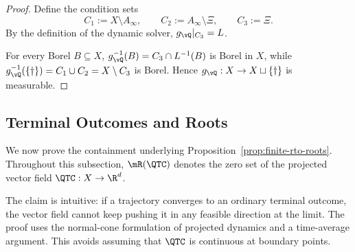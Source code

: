 \begin{proof}
Define the condition sets
\[
C_1:=X\setminus A_\infty,\qquad
C_2:=A_\infty\setminus\Xi,\qquad
C_3:=\Xi.
\]
By the definition of the dynamic solver, $g_{\vQ}|_{C_3}=L$.

For every Borel $B\subseteq X$, $g_{\vQ}^{-1}(B)=C_3\cap L^{-1}(B)$ is Borel
in $X$, while $g_{\vQ}^{-1}(\{\dagger\})=C_1\cup C_2=X\setminus C_3$ is Borel.
Hence
$g_{\vQ}:X\to X\sqcup\{\dagger\}$ is measurable.
\end{proof}

\subsection{Terminal Outcomes and Roots}

We now prove the containment underlying Proposition~\ref{prop:finite-rto-roots}.
Throughout this subsection, $\mR(\QTC)$ denotes the zero set of the projected
vector field $\QTC:X\to\R^d$.

The claim is intuitive: if a trajectory converges to an ordinary terminal
outcome, the vector field cannot keep pushing it in any feasible direction at the
limit. The proof uses the normal-cone formulation of projected dynamics and a
time-average argument. This avoids assuming that $\QTC$ is continuous at
boundary points.

